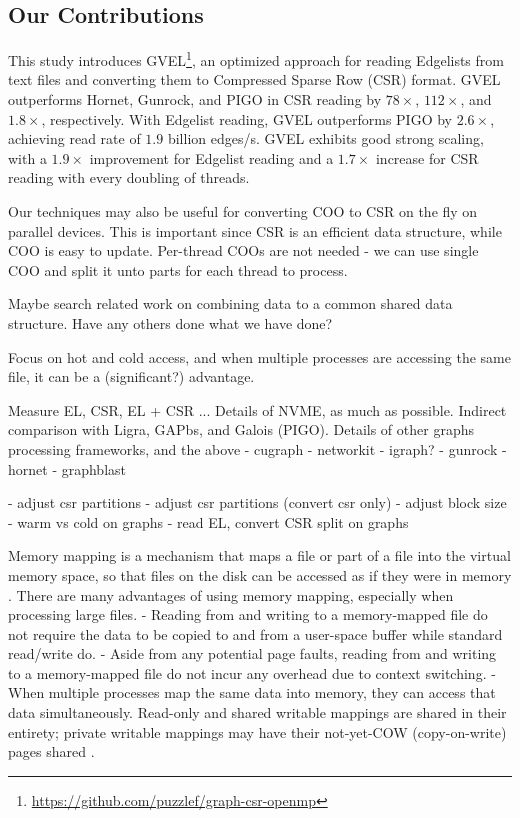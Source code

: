 \subsection{Our Contributions}

This study introduces GVEL\footnote{\url{https://github.com/puzzlef/graph-csr-openmp}}, an optimized approach for reading Edgelists from text files and converting them to Compressed Sparse Row (CSR) format. GVEL outperforms Hornet, Gunrock, and PIGO in CSR reading by $78\times$, $112\times$, and $1.8\times$, respectively. With Edgelist reading, GVEL outperforms PIGO by $2.6\times$, achieving read rate of $1.9$ billion edges/s. GVEL exhibits good strong scaling, with a $1.9\times$ improvement for Edgelist reading and a $1.7\times$ increase for CSR reading with every doubling of threads.

Our techniques may also be useful for converting COO to CSR on the fly on parallel devices. This is important since CSR is an efficient data structure, while COO is easy to update. Per-thread COOs are not needed - we can use single COO and split it unto parts for each thread to process.

Maybe search related work on combining data to a common shared data structure. Have any others done what we have done?

Focus on hot and cold access, and when multiple processes are accessing the same file, it can be a (significant?) advantage.

Measure EL, CSR, EL + CSR ...
Details of NVME, as much as possible.
Indirect comparison with Ligra, GAPbs, and Galois (PIGO).
Details of other graphs processing frameworks, and the above
- cugraph
- networkit
- igraph?
- gunrock
- hornet
- graphblast

- adjust csr partitions
- adjust csr partitions (convert csr only)
- adjust block size
- warm vs cold on graphs
- read EL, convert CSR split on graphs



Memory mapping is a mechanism that maps a file or part of a file into the virtual memory space, so that files on the disk can be accessed as if they were in memory \cite{lin2014mmap}. There are many advantages of using memory mapping, especially when processing large files. - Reading from and writing to a memory-mapped file do not require the data to be copied to and from a user-space buffer while standard read/write do. - Aside from any potential page faults, reading from and writing to a memory-mapped file do not incur any overhead due to context switching. - When multiple processes map the same data into memory, they can access that data simultaneously. Read-only and shared writable mappings are shared in their entirety; private writable mappings may have their not-yet-COW (copy-on-write) pages shared \cite{lin2014mmap}.




